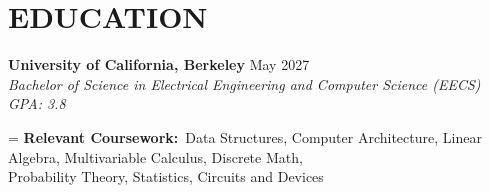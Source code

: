 \section*{EDUCATION}
\noindent
\textbf{University of California, Berkeley} \hfill May 2027 \\
\textit{Bachelor of Science in Electrical Engineering and Computer Science (EECS)} \hfill \textit{GPA: 3.8}

\noindent
\begingroup
{}%
\hangindent=
\textbf{Relevant Coursework:}\ \nohyphens{Data Structures, Computer Architecture, Linear Algebra, Multivariable Calculus, Discrete Math, \\ Probability Theory, Statistics, Circuits and Devices}
\par
\endgroup

\vspace{-1em}
